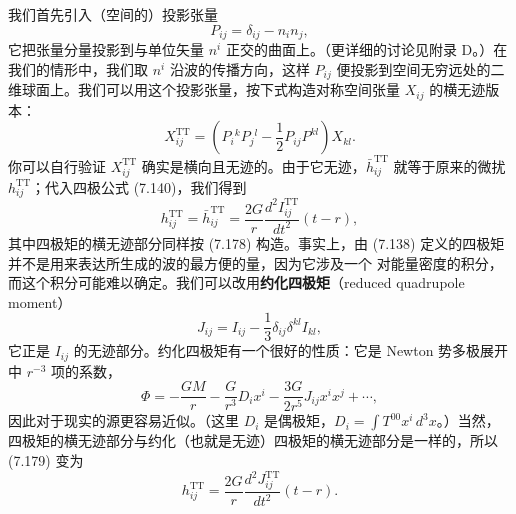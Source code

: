 我们首先引入（空间的）投影张量
\begin{equation*}
P_{ij} = \delta_{ij} - n_i n_j,
\tag{7.177}
\end{equation*}
它把张量分量投影到与单位矢量 $n^i$ 正交的曲面上。（更详细的讨论见附录 D。）在我们的情形中，我们取 $n^i$ 沿波的传播方向，这样 $P_{ij}$ 便投影到空间无穷远处的二维球面上。我们可以用这个投影张量，按下式构造对称空间张量 $X_{ij}$ 的横无迹版本：
\begin{equation*}
X^{\mathrm{TT}}_{ij} = \left(P_i{}^k P_j{}^l - \frac{1}{2}P_{ij}P^{kl}\right)X_{kl}.
\tag{7.178}
\end{equation*}
你可以自行验证 $X^{\mathrm{TT}}_{ij}$ 确实是横向且无迹的。由于它无迹，$\bar{h}^{\mathrm{TT}}_{ij}$ 就等于原来的微扰 $h^{\mathrm{TT}}_{ij}$；代入四极公式 (7.140)，我们得到
\begin{equation*}
h^{\mathrm{TT}}_{ij} = \bar{h}^{\mathrm{TT}}_{ij} = \frac{2G}{r}\frac{d^2 I^{\mathrm{TT}}_{ij}}{dt^2}(t - r),
\tag{7.179}
\end{equation*}
其中四极矩的横无迹部分同样按 (7.178) 构造。事实上，由 (7.138) 定义的四极矩并不是用来表达所生成的波的最方便的量，因为它涉及一个
对能量密度的积分，而这个积分可能难以确定。我们可以改用\textbf{约化四极矩}（reduced quadrupole moment）
\begin{equation*}
J_{ij} = I_{ij} - \frac{1}{3}\delta_{ij}\delta^{kl}I_{kl},
\tag{7.180}
\end{equation*}
它正是 $I_{ij}$ 的无迹部分。约化四极矩有一个很好的性质：它是 Newton 势多极展开中 $r^{-3}$ 项的系数，
\begin{equation*}
\Phi = -\frac{GM}{r} - \frac{G}{r^3}D_i x^i - \frac{3G}{2r^5}J_{ij}x^i x^j + \cdots,
\tag{7.181}
\end{equation*}
因此对于现实的源更容易近似。（这里 $D_i$ 是偶极矩，$D_i = \int T^{00}x^i\, d^3x$。）当然，四极矩的横无迹部分与约化（也就是无迹）四极矩的横无迹部分是一样的，所以 (7.179) 变为
\begin{equation*}
h^{\mathrm{TT}}_{ij} = \frac{2G}{r}\frac{d^2 J^{\mathrm{TT}}_{ij}}{dt^2}(t - r).
\tag{7.182}
\end{equation*}

